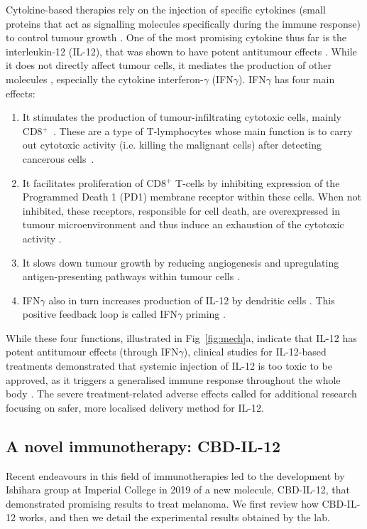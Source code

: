 \documentclass[11pt]{article}
\begin{document}
Cytokine-based therapies rely on the injection of specific cytokines (small proteins that act as signalling molecules specifically during the immune response) to control tumour growth \cite{ioDef}. One of the most promising cytokine thus far is the interleukin-12 (IL-12), that was shown to have potent antitumour effects \cite{il12IsCool}. While it does not directly affect tumour cells, it mediates the production of other molecules \cite{il12CytokineStorm}, especially the cytokine interferon-$\gamma$ (IFN$\gamma$). IFN$\gamma$ has four main effects:
\begin{enumerate}
    \item It stimulates the production of tumour-infiltrating cytotoxic cells, mainly CD8$^+$~\cite{ifngNKProd}\cite{ifnCD8}. These are a type of T-lymphocytes whose main function is to carry out cytotoxic activity (i.e. killing the malignant cells) after detecting cancerous cells~\cite{cd8Effects}.     
    \item It facilitates proliferation of CD8$^+$ T-cells by inhibiting expression of the Programmed Death 1 (PD1) membrane receptor within these cells. When not inhibited, these receptors, responsible for cell death, are overexpressed in tumour microenvironment and thus induce an exhaustion of the cytotoxic activity \cite{exhaustionPD1}.  
    \item It slows down tumour growth by reducing angiogenesis \cite{ifngAngiogenesis} and upregulating antigen-presenting pathways within tumour cells \cite{ifngAntigenExposure}.
    \item IFN$\gamma$ also in turn increases production of IL-12 by dendritic cells \cite{wang}. This positive feedback loop is called IFN$\gamma$ priming \cite{liuifng}\cite{ma2015}.
\end{enumerate}
While these four functions, illustrated in Fig~\ref{fig:mech}a, indicate that IL-12 has potent antitumour effects (through IFN$\gamma$), clinical studies for IL-12-based treatments demonstrated that systemic injection of IL-12 is too toxic to be approved, as it triggers a generalised immune response throughout the whole body \cite{clintriAC1}\cite{clintriAC3}. The severe treatment-related adverse effects called for additional research focusing on safer, more localised delivery method for IL-12.

\subsection{A novel immunotherapy: CBD-IL-12}\label{ssec:cbd}
Recent endeavours in this field of immunotherapies led to the development by Ishihara group at Imperial College in 2019 \cite{cbdil12} of a new molecule, CBD-IL-12, that demonstrated promising results to treat melanoma. We first review how CBD-IL-12 works, and then we detail the experimental results obtained by the lab. 
\end{document}
